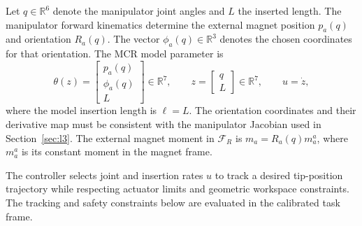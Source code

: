 \documentclass[journal]{IEEEtran}
\begin{document}
Let $q\in\mathbb R^6$ denote the manipulator joint angles and $L$ the
inserted length. The manipulator forward kinematics determine the
external magnet position $p_a(q)$ and orientation $R_a(q)$. The vector
$\phi_a(q)\in\mathbb R^3$ denotes the chosen coordinates for that
orientation. The MCR model parameter is
\begin{equation}
\theta(z)=
\begin{bmatrix}
p_a(q)\\ \phi_a(q)\\ L
\end{bmatrix}\in\mathbb R^7,\qquad
z=\begin{bmatrix}q\\L\end{bmatrix}\in\mathbb R^7,
\qquad
u=\dot z,
\label{eq:config}
\end{equation}
where the model insertion length is $\ell=L$. The orientation
coordinates and their derivative map must be consistent with the
manipulator Jacobian used in Section~\ref{sec:l3}. The external magnet
moment in $\mathcal F_R$ is $m_a=R_a(q)m_a^a$, where $m_a^a$ is its
constant moment in the magnet frame.

The controller selects joint and insertion rates $u$ to track a desired
tip-position trajectory while respecting actuator limits and geometric
workspace constraints. The tracking and safety constraints below are
evaluated in the calibrated task frame.
\end{document}
